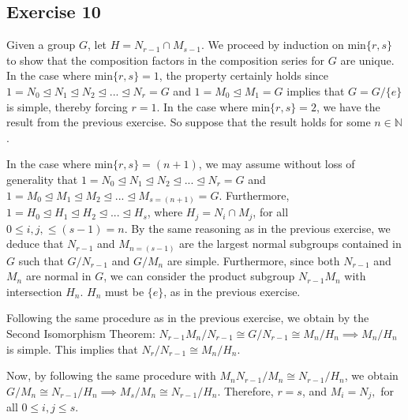 \subsection*{Exercise 10}
Given a group $G$, let $H = N_{r-1} \cap M_{s-1}$. We proceed by induction on min$\{r,s\}$ to show that the composition factors in the composition series for $G$ are unique. In the case where min$\{r,s\} = 1$, the property certainly holds since $1 = N_0 \trianglelefteq N_1 \trianglelefteq N_2 \trianglelefteq ... \trianglelefteq N_r = G$ and $1 = M_0 \trianglelefteq M_1 = G$ implies that $G = G/\{e\}$ is simple, thereby forcing $r = 1$. In the case where min$\{r,s\} = 2$, we have the result from the previous exercise. So suppose that the result holds for some $n \in \mathbb{N}$.

In the case where min$\{r,s\} = (n+1)$, we may assume without loss of generality that $1 = N_0 \trianglelefteq N_1 \trianglelefteq N_2 \trianglelefteq ... \trianglelefteq N_r = G$ and $1 = M_0 \trianglelefteq M_1 \trianglelefteq M_2 \trianglelefteq ... \trianglelefteq M_{s=(n+1)} = G$. Furthermore, $1 = H_0 \trianglelefteq H_1 \trianglelefteq H_2 \trianglelefteq ... \trianglelefteq H_s$, where $H_j = N_i \cap M_j$, for all $0 \le i,j, \le (s-1)=n$. By the same reasoning as in the previous exercise, we deduce that $N_{r-1}$ and $M_{n = (s-1)}$ are the largest normal subgroups contained in $G$ such that $G/N_{r-1}$ and $G/M_n$ are simple. Furthermore, since both $N_{r-1}$ and $M_n$ are normal in $G$, we can consider the product subgroup $N_{r-1}M_n$ with intersection $H_n$. $H_n$ must be $\{e\}$, as in the previous exercise.

Following the same procedure as in the previous exercise, we obtain by the Second Isomorphism Theorem: $N_{r-1}M_n/N_{r-1} \cong G/N_{r-1} \cong M_n/H_n \implies M_n/H_n$ is simple. This implies that $N_r/N_{r-1} \cong M_n/H_n$. 

Now, by following the same procedure with $M_nN_{r-1}/M_n \cong N_{r-1}/H_n$, we obtain $G/M_n \cong N_{r-1}/H_n \implies M_s/M_n \cong N_{r-1}/H_n$. Therefore, $r = s$, and $M_i = N_j,$ for all $0 \le i,j \le s$.